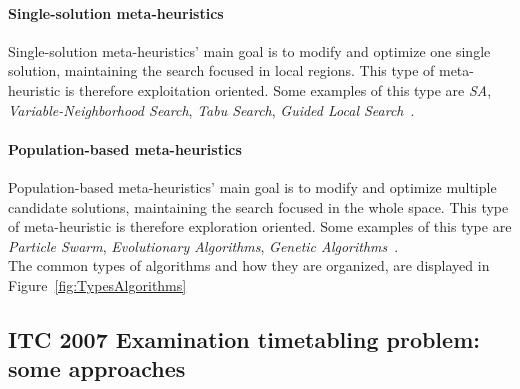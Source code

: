 \paragraph{Single-solution meta-heuristics}
Single-solution meta-heuristics' main goal is to modify and optimize one single solution, maintaining the search focused in local regions. This type of meta-heuristic is therefore exploitation oriented. Some examples of this type are \textit{SA}, \textit{Variable-Neighborhood Search}, \textit{Tabu Search}, \textit{Guided Local Search}~\cite{Talbi2009}. \\

\paragraph{Population-based meta-heuristics}
Population-based meta-heuristics' main goal is to modify and optimize multiple candidate solutions, maintaining the search focused in the whole space. This type of meta-heuristic is therefore exploration oriented. Some examples of this type are \textit{Particle Swarm}, \textit{Evolutionary Algorithms}, \textit{Genetic Algorithms}~\cite{Talbi2009}.\\

The common types of algorithms and how they are organized, are displayed in Figure~\ref{fig:TypesAlgorithms}


\subsection{ITC 2007 Examination timetabling problem: some approaches}
\label{subsection:ApprITC2007}

